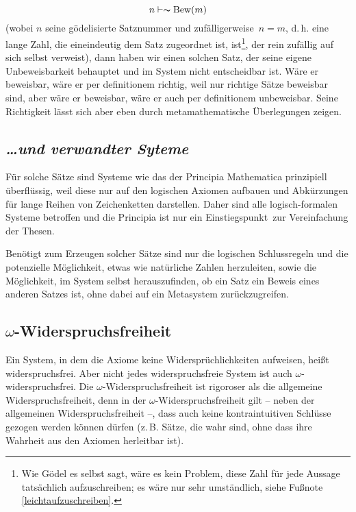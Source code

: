 $$
n \vdash \thicksim \text{Bew}\left(m\right)
$$
(wobei $n$ seine gödelisierte Satznummer und \frq zufälligerweise\flq\ $n = m$,
d.\,h. eine lange Zahl, die eineindeutig dem
Satz zugeordnet ist, ist\footnote{Wie Gödel es selbst sagt, wäre es kein
Problem, diese Zahl für jede Aussage tatsächlich
aufzuschreiben; es wäre nur sehr umständlich,
siehe Fußnote \ref{leichtaufzuschreiben}.}, der rein zufällig auf sich selbst verweist),
dann haben wir einen solchen Satz, der seine eigene Unbeweisbarkeit
behauptet und im System nicht entscheidbar ist. Wäre er beweisbar, wäre er per definitionem
richtig, weil nur richtige Sätze beweisbar sind, aber wäre er beweisbar, wäre er auch
per definitionem unbeweisbar. Seine Richtigkeit lässt sich aber eben durch
metamathematische Überlegungen zeigen.

\subsection*{\frq\textit{\dots und verwandter Syteme}\flq}

Für solche Sätze sind Systeme wie das der Principia Mathematica prinzipiell
überflüssig,
weil diese nur auf den logischen Axiomen aufbauen und Abkürzungen für lange Reihen von
Zeichenketten darstellen. Daher sind alle logisch-formalen Systeme betroffen und die
Principia ist nur ein \frq Einstiegspunkt\flq\ zur Vereinfachung der Thesen.

Benötigt zum Erzeugen solcher Sätze sind nur die logischen Schlussregeln und die
potenzielle Möglichkeit, etwas wie natürliche Zahlen herzuleiten, sowie die Möglichkeit,
im System selbst herauszufinden, ob ein Satz ein Beweis eines anderen Satzes ist, ohne dabei
auf ein Metasystem zurückzugreifen.

\subsection*{$\omega$-Widerspruchsfreiheit}

Ein System, in dem die Axiome keine Widersprüchlichkeiten aufweisen, heißt
\frq widerspruchsfrei\flq. Aber nicht jedes widerspruchsfreie System ist auch
$\omega$-widerspruchsfrei. Die $\omega$-Widerspruchsfreiheit ist rigoroser als
die allgemeine Widerspruchsfreiheit, denn in der $\omega$-Widerspruchsfreiheit
gilt -- neben der allgemeinen Widerspruchsfreiheit --, dass auch keine kontraintuitiven
Schlüsse gezogen werden können dürfen (z.\,B. Sätze, die wahr sind, ohne dass
ihre Wahrheit aus den Axiomen herleitbar ist).

